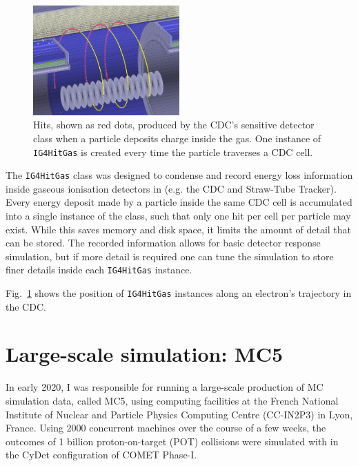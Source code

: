 \begin{figure}
    \centering
    \includegraphics[width=0.5\textwidth]{chapter3/hit_instances_blur_crop.png}
    \caption{Hits, shown as red dots, produced by the CDC's sensitive detector class when a particle deposits charge inside the gas. One instance of \texttt{IG4HitGas} is created every time the particle traverses a CDC cell.}
    \label{fig:sim_cdc_hits}
\end{figure}

The \texttt{IG4HitGas} class was designed to condense and record energy loss information inside gaseous ionisation detectors in \SimG (e.g. the CDC and Straw-Tube Tracker). Every energy deposit made by a particle inside the same CDC cell is accumulated into a single instance of the class, such that only one hit per cell per particle may exist. While this saves memory and disk space, it limits the amount of detail that can be stored. The recorded information allows for basic detector response simulation, but if more detail is required one can tune the \SimG simulation to store finer details inside each \texttt{IG4HitGas} instance.

Fig.~\ref{fig:sim_cdc_hits} shows the position of \texttt{IG4HitGas} instances along an electron's trajectory in the CDC.


\section{Large-scale simulation: MC5}\label{sec:mc5}
In early 2020, I was responsible for running a large-scale production of MC simulation data, called MC5, using computing facilities at the French National Institute of Nuclear and Particle Physics Computing Centre (CC-IN2P3) in Lyon, France.
Using \num{2000} concurrent machines over the course of a few weeks, the outcomes of 1 billion proton-on-target (POT) collisions were simulated with \SimG in the CyDet configuration of COMET Phase-I.

